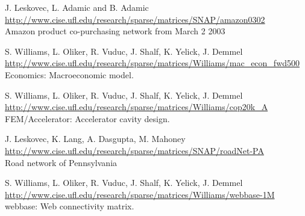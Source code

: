 	{
		{
			J. Leskovec, L. Adamic and B. Adamic 
		}
		{
			\url{http://www.cise.ufl.edu/research/sparse/matrices/SNAP/amazon0302} \\
			Amazon product co-purchasing network from March 2 2003
		}
	}

	{
		{
			S. Williams, L. Oliker, R. Vuduc, J. Shalf, K. Yelick, J. Demmel 
		}
		{
			\url{http://www.cise.ufl.edu/research/sparse/matrices/Williams/mac_econ_fwd500} \\
			Economics: Macroeconomic model.
		}
	}

	{
		{
			S. Williams, L. Oliker, R. Vuduc, J. Shalf, K. Yelick, J. Demmel 
		}
		{
			\url{http://www.cise.ufl.edu/research/sparse/matrices/Williams/cop20k_A} \\
			FEM/Accelerator: Accelerator cavity design.
		}
	}

	{
		{
			J. Leskovec, K. Lang, A. Dasgupta, M. Mahoney 
		}
		{
			\url{http://www.cise.ufl.edu/research/sparse/matrices/SNAP/roadNet-PA} \\
			Road network of Pennsylvania
		}
	}

	{
		{
			S. Williams, L. Oliker, R. Vuduc, J. Shalf, K. Yelick, J. Demmel 
		}
		{
			\url{http://www.cise.ufl.edu/research/sparse/matrices/Williams/webbase-1M} \\
			webbase: Web connectivity matrix.
		}
	}

